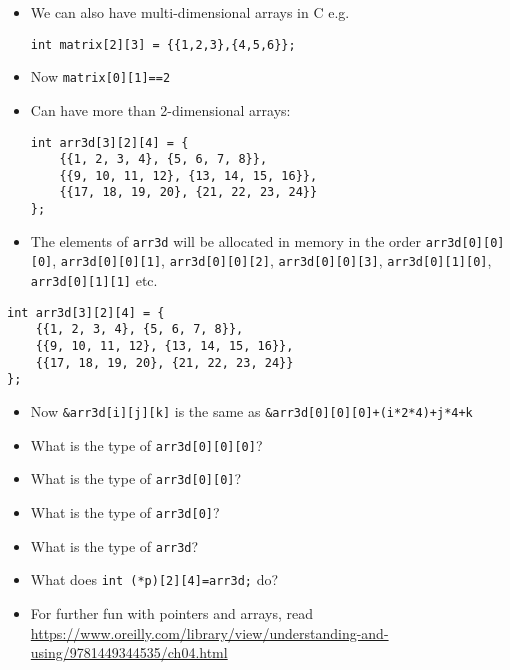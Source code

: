 \documentclass{article}
\begin{document}
\begin{itemize}
\item We can also have multi-dimensional arrays in C e.g.
\begin{verbatim}
int matrix[2][3] = {{1,2,3},{4,5,6}};
\end{verbatim}
\item Now \verb!matrix[0][1]==2!
\item Can have more than 2-dimensional arrays:
\begin{verbatim}
int arr3d[3][2][4] = {
    {{1, 2, 3, 4}, {5, 6, 7, 8}},
    {{9, 10, 11, 12}, {13, 14, 15, 16}},
    {{17, 18, 19, 20}, {21, 22, 23, 24}}
};
\end{verbatim}
\item The elements of \verb!arr3d! will be allocated in memory in the order \verb!arr3d[0][0][0]!,  \verb!arr3d[0][0][1]!,  \verb!arr3d[0][0][2]!,  \verb!arr3d[0][0][3]!,  \verb!arr3d[0][1][0]!,  \verb!arr3d[0][1][1]! etc.
\end{itemize}



\begin{verbatim}
int arr3d[3][2][4] = {
    {{1, 2, 3, 4}, {5, 6, 7, 8}},
    {{9, 10, 11, 12}, {13, 14, 15, 16}},
    {{17, 18, 19, 20}, {21, 22, 23, 24}}
};
\end{verbatim}
\begin{itemize}
\item Now \verb!&arr3d[i][j][k]! is the same as \verb!&arr3d[0][0][0]+(i*2*4)+j*4+k!
\item What is the type of \verb!arr3d[0][0][0]!?
\item What is the type of \verb!arr3d[0][0]!?
\item What is the type of \verb!arr3d[0]!?
\item What is the type of \verb!arr3d!?
\item What does \verb!int (*p)[2][4]=arr3d;! do?
\item For further fun with pointers and arrays, read \url{https://www.oreilly.com/library/view/understanding-and-using/9781449344535/ch04.html}
\end{itemize}
\end{document}
